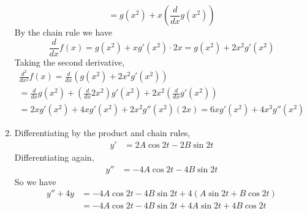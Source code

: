 \documentclass{article}
\begin{document}
\begin{enumerate}
\begin{equation*}
    = g(x^2) + x \left(\frac{d}{dx} g(x^2) \right) 
  \end{equation*}
  By the chain rule we have
  \begin{equation*}
    \frac{d}{dx} f(x) = g(x^2) + x g'(x^2) \cdot 2x = g(x^2) + 2x^2
    g'(x^2) 
  \end{equation*}
  Taking the second derivative,
  \begin{multline*}
    \frac{d^2}{dx^2} f(x) 
    = \frac{d}{dx} \left( g(x^2) + 2x^2 g'(x^2) \right) 
    \\
    = \frac{d}{dx} g(x^2) + \left( \frac{d}{dx} 2x^2\right) g'(x^2) 
    + 2x^2 \left( \frac{d}{dx} g'(x^2) \right)
    \\
    = 2xg'(x^2) + 4x g'(x^2) + 2x^2 g''(x^2) (2x) 
    = 6x g'(x^2) + 4x^3 g''(x^2) 
  \end{multline*}
\item %
  Differentiating by the product and chain rules,
  \begin{align*}
    y' &= 2A \cos 2t - 2B \sin 2t
  \end{align*}
  Differentiating again,
  \begin{align*}
    y'' &= -4A \cos 2t - 4B \sin 2t
  \end{align*}
  So we have
  \begin{align*}
    y'' + 4y &= -4A \cos 2t - 4B \sin 2t + 4(A\sin 2t + B\cos 2t)
    \\
             &= -4A \cos 2t - 4B \sin 2t + 4A \sin 2t + 4B \cos 2t
    \\

\end{align*}
\end{enumerate}
\end{document}
